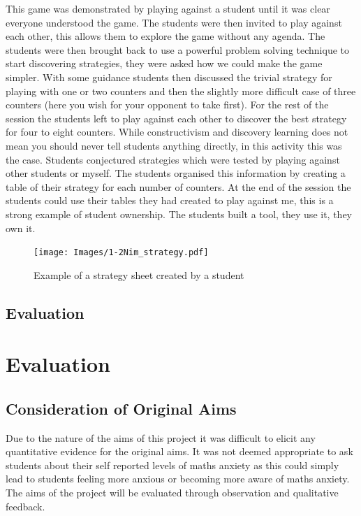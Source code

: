 \documentclass[11pt, a4paper, notitlepage]{article}
\begin{document}
This game was demonstrated by playing against a student until it was clear everyone understood the game. The students were then invited to play against each other, this allows them to explore the game without any agenda. The students were then brought back to use a powerful problem solving technique to start discovering strategies, they were asked how we could make the game simpler. With some guidance students then discussed the trivial strategy for playing with one or two counters and then the slightly more difficult case of three counters (here you wish for your opponent to take first). For the rest of the session the students left to play against each other to discover the best strategy for four to eight counters. While constructivism and discovery learning does not mean you should never tell students anything directly, in this activity this was the case. Students conjectured strategies which were tested by playing against other students or myself. The students organised this information by creating a table of their strategy for each number of counters. At the end of the session the students could use their tables they had created to play against me, this is a strong example of student ownership. The students built a tool, they use it, they own it. 
\begin{figure}[h]
    \centering
    \texttt{[image: Images/1-2Nim\_strategy.pdf]}
    \caption{Example of a strategy sheet created by a student}
\end{figure}

\subsection*{Evaluation}

\section{Evaluation}

\subsection{Consideration of Original Aims}
Due to the nature of the aims of this project it was difficult to elicit any quantitative evidence for the original aims. It was not deemed appropriate to ask students about their self reported levels of maths anxiety as this could simply lead to students feeling more anxious or becoming more aware of maths anxiety. The aims of the project will be evaluated through observation and qualitative feedback.
\end{document}

